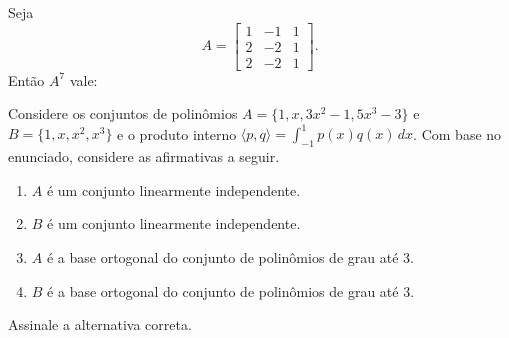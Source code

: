 \documentclass[10pt,a4paper]{article}
\begin{document}
{
\def\AMCbeginQuestion#1#2{\par\noindent{\bf (POSCOMP 2010 - Questão 03)}}
\begin{question}{} Seja
\[
A=\left[\begin{array}{rrr}1&-1&1\\2&-2&1\\2&-2&1\end{array}\right].
\]
Então $A^{7}$ vale:
\begin{choices}
\end{choices}
\end{question}
}
%
{
\def\AMCbeginQuestion#1#2{\par\noindent{\bf (POSCOMP 2010 - Questão 05)}}
\begin{question}{} Considere os conjuntos de polinômios $A=\{1,x,3x^{2}-1,5x^{3}-3\}$ e $B=\{1,x,x^{2},x^{3}\}$ e o produto interno $\langle p,q\rangle=\int_{-1}^{1}p(x)q(x)\,dx$.
Com base no enunciado, considere as afirmativas a seguir.
\begin{enumerate}
\item[I.] $A$ é um conjunto linearmente independente.
\item[II.] $B$ é um conjunto linearmente independente.
\item[III.] $A$ é a base ortogonal do conjunto de polinômios de grau até 3.
\item[IV.] $B$ é a base ortogonal do conjunto de polinômios de grau até 3.
\end{enumerate}
Assinale a alternativa correta.
\begin{choices}
\end{choices}
\end{question}
}
\end{document}
